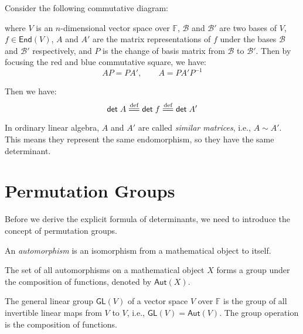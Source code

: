 \documentclass[
	11pt, %
	fleqn, %
	a4paper, %
]{LegrandOrangeBook}
\newcommand{\End}[1]{\mathsf{End}(#1)} %
\newcommand{\F}{\mathbb{F}} %
\newcommand{\B}{\mathcal{B}} %
\renewcommand{\det}{\mathsf{det\;}} %
\newcommand{\GL}{\mathsf{GL}} %
\newcommand{\Aut}{\mathsf{Aut}} %
\begin{document}
Consider the following commutative diagram:
\begin{center}
\end{center}
where $V$ is an $n$-dimensional vector space over $\F$, $\B$ and $\B'$ are two bases of $V$, $f \in \End{V}$, $A$ and $A'$ are the matrix representations of $f$ under the bases $\B$ and $\B'$ respectively, and $P$ is the change of basis matrix from $\B$ to $\B'$. Then by focusing the red and blue commutative square, we have:
\[
    AP = PA', \qquad A = P A' P^{-1}
\]

Then we have:
\[
    \det A \overset{\text{def}}{=\joinrel=} \det f  \overset{\text{def}}{=\joinrel=} \det A'
\]

In ordinary linear algebra, $A$ and $A'$ are called \emph{similar matrices}, i.e., $A \sim A'$. This means they represent the same endomorphism, so they have the same determinant.

\newpage

\section{Permutation Groups}

Before we derive the explicit formula of determinants, we need to introduce the concept of permutation groups.

\begin{definition}[Automorphisms]
    An \emph{automorphism} is an isomorphism from a mathematical object to itself.
\end{definition}

\begin{definition}
    The set of all automorphisms on a mathematical object $X$ forms a group under the composition of functions, denoted by $\Aut(X)$.
\end{definition}

\begin{example}
    The general linear group $\GL(V)$ of a vector space $V$ over $\F$ is the group of all invertible linear maps from $V$ to $V$, i.e., $\GL(V) = \Aut(V)$. The group operation is the composition of functions.
\end{example}
\end{document}
